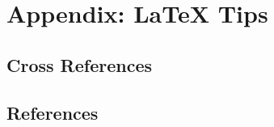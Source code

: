 \documentclass[conference]{IEEEtran}
\begin{document}
\section{Appendix: \LaTeX\xspace Tips}

\subsection{Cross References}
\label{sec:cross-ref}

%
%
%


%
%

\subsection{References}
\end{document}
